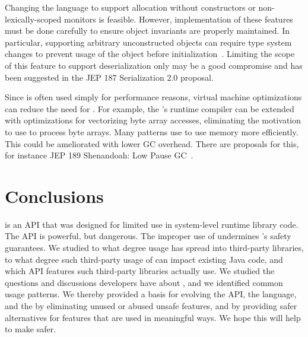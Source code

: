 Changing the language to support allocation without constructors or non-lexically-scoped monitors is feasible.
However, implementation of these
features must be done carefully to ensure object invariants
are properly maintained.
In particular, supporting arbitrary unconstructed
objects can require type system changes to prevent usage of the object 
before initialization~\citep{qiMaskedTypesSound2009}.
Limiting the scope of this feature to support deserialization only may be a good compromise and
has been suggested in the JEP 187 Serialization 2.0 proposal.

Since \unsafe{} is often used simply for performance reasons,
virtual machine optimizations can reduce the need for \unsafe{}.
For example, the \jvm{}'s runtime compiler can be extended with optimizations for vectorizing byte array accesses,
eliminating the motivation to use \unsafe{} to process byte arrays.
Many patterns use \unsafe{} to use memory more efficiently.
This could be ameliorated with lower GC overhead.
There are proposals for this, for instance JEP 189 Shenandoah:
Low Pause GC~\citep{jep189}.

\section{Conclusions}
\label{sec:unsafe:conclusions}

\smu{} is an API that was designed for limited use in system-level runtime library code.
The \unsafe{} API is powerful, but dangerous.
The improper use of \unsafe{} undermines \java{}'s safety guarantees.
We studied to what degree \unsafe{} usage has spread into third-party libraries,
to what degree such third-party usage of \unsafe{} can impact existing Java code,
and which \unsafe{} API features such third-party libraries actually use.
We studied the questions and discussions developers have about \unsafe{},
and we identified common usage patterns.
We thereby provided a basis for evolving the \unsafe{} API, the \java{} language, and the \jvm{}
by eliminating unused or abused unsafe features,
and by providing safer alternatives for features that are used in meaningful ways.
We hope this will help to make \unsafe{} safer.